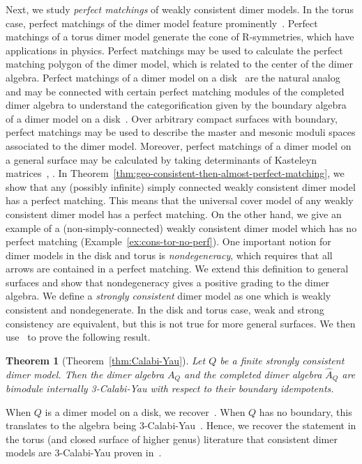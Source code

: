 \documentclass{article}
\newtheorem{thmIntro}{Theorem}    \renewcommand{\thethmIntro}{\Alph{thmIntro}}
\theoremstyle{definition}
\begin{document}
Next, we study \textit{perfect matchings} of weakly consistent dimer models. In the torus case, perfect matchings of the dimer model feature prominently~\cite{XIU,XBroomhead2009,XBocklandt2011}. Perfect matchings of a torus dimer model generate the cone of R-symmetries, which have applications in physics. Perfect matchings may be used to calculate the perfect matching polygon of the dimer model, which is related to the center of the dimer algebra.
Perfect matchings of a dimer model on a disk~\cite{CKP,XLam2015} are the natural analog and may be connected with certain perfect matching modules of the completed dimer algebra to understand the categorification given by the boundary algebra of a dimer model on a disk~\cite{CKP}.
{Over arbitrary compact surfaces with boundary, perfect matchings may be used to describe the master and mesonic moduli spaces associated to the dimer model. Moreover, perfect matchings of a dimer model on a general surface may be calculated by taking determinants of Kasteleyn matrices~\cite{HaK}, \cite[\S5]{BFTFDBPTSA}.}
In Theorem~\ref{thm:geo-consistent-then-almost-perfect-matching}, we show that any (possibly infinite) simply connected weakly consistent dimer model has a perfect matching. This means that the universal cover model of any weakly consistent dimer model has a perfect matching. On the other hand, we give an example of a (non-simply-connected) weakly consistent dimer model which has no perfect matching (Example~\ref{ex:cons-tor-no-perf}).
One important notion for dimer models in the disk and torus is \textit{nondegeneracy}, which requires that all arrows are contained in a perfect matching. We extend this definition to general surfaces and show that nondegeneracy gives a positive grading to the dimer algebra.
We define a \textit{strongly consistent} dimer model as one which is weakly consistent and nondegenerate. In the disk and torus case, weak and strong consistency are equivalent, but this is not true for more general surfaces.
We then use~\cite{XPressland2019} to prove the following result. 
\begin{thmIntro}[{Theorem~\ref{thm:Calabi-Yau}}]\label{thm:AAAz}
	Let $Q$ be a finite strongly consistent dimer model. Then the dimer algebra $A_Q$ and the completed dimer algebra $\widehat A_Q$ are bimodule internally 3-Calabi-Yau with respect to their boundary idempotents.
\end{thmIntro}
When $Q$ is a dimer model on a disk, we recover~\cite[Theorem 3.7]{XPressland2019}. When $Q$ has no boundary, this translates to the algebra being 3-Calabi-Yau~\cite[Remark 2.2]{XPressland2015}. Hence, we recover the statement in the torus (and closed surface of higher genus) literature that consistent dimer models are 3-Calabi-Yau proven in~\cite[Corollary 4.4]{XDavison}.
\end{document}
